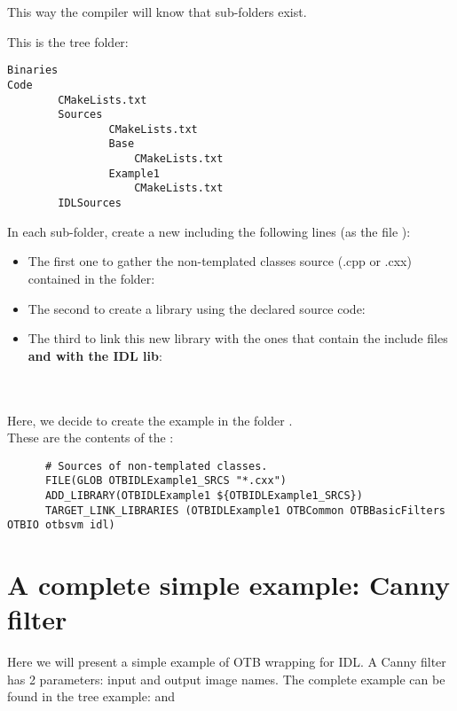 This way the compiler will know that sub-folders exist.
 
This is the tree folder:
\begin{verbatim}
Binaries
Code
        CMakeLists.txt
        Sources
                CMakeLists.txt
                Base
                    CMakeLists.txt
                Example1
                    CMakeLists.txt
        IDLSources
\end{verbatim}
 
In each sub-folder, create a new  including the following lines (as the file ):
\begin{itemize}
\item The first one to gather the non-templated classes source (.cpp or .cxx) contained in the folder:\\ 
\item The second to create a library using the declared source code:\\
\item The third to link this new library with the ones that contain the include files \textbf{and with the IDL lib}:\\
\\ 
\end{itemize}

\\
      Here, we decide to create the example  in the folder .\\
      These are the contents of the :\\
\begin{verbatim}
      # Sources of non-templated classes.
      FILE(GLOB OTBIDLExample1_SRCS "*.cxx")
      ADD_LIBRARY(OTBIDLExample1 ${OTBIDLExample1_SRCS})
      TARGET_LINK_LIBRARIES (OTBIDLExample1 OTBCommon OTBBasicFilters OTBIO otbsvm idl)
\end{verbatim}


\section{A complete simple example: Canny filter}
\label{canny}
Here we will present a simple example of OTB wrapping for IDL.
A Canny filter has 2 parameters: input and output image names.
The complete example can be found in the tree example:  and 
